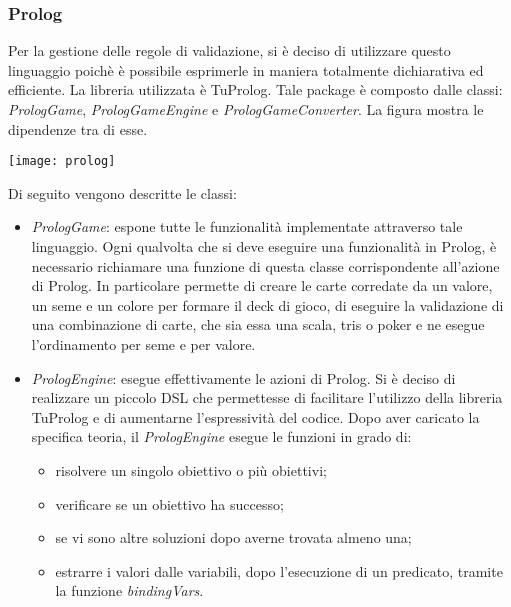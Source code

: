 \subsubsection{Prolog}
Per la gestione delle regole di validazione, si è deciso di utilizzare questo linguaggio poichè è possibile esprimerle in maniera totalmente dichiarativa ed efficiente. La libreria utilizzata è TuProlog.
\newline
\newline Tale package è composto dalle classi: \textit{PrologGame}, \textit{PrologGameEngine} e \textit{PrologGameConverter}. La figura mostra le dipendenze tra di esse.
\begin{center}
    \texttt{[image: prolog]}
\end{center}
Di seguito vengono descritte le classi:
\begin{itemize}
    \item \textit{PrologGame}: espone tutte le funzionalità implementate attraverso tale linguaggio. Ogni qualvolta che si deve eseguire una funzionalità in Prolog, è necessario richiamare una funzione di questa classe corrispondente all’azione di Prolog.
    In particolare permette di creare le carte corredate da un valore, un seme e un colore per formare il deck di gioco, di eseguire la validazione di una combinazione di carte, che sia essa una scala, tris o poker e ne esegue l’ordinamento per seme e per valore.

    \item \textit{PrologEngine}: esegue effettivamente le azioni di Prolog.
    Si è deciso di realizzare un piccolo DSL che permettesse di facilitare l’utilizzo della libreria TuProlog e di aumentarne l’espressività del codice. Dopo aver caricato la specifica teoria, il \textit{PrologEngine} esegue le funzioni in grado di:
    \begin{itemize}
        \item risolvere un singolo obiettivo o più obiettivi;
        \item verificare se un obiettivo ha successo;
        \item se vi sono altre soluzioni dopo averne trovata almeno una;
        \item estrarre i valori dalle variabili, dopo l’esecuzione di un predicato, tramite la funzione \textit{bindingVars}.
    \end{itemize}


\end{itemize}
